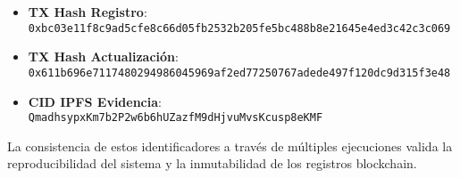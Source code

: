 \begin{itemize}
    \item \textbf{TX Hash Registro}: \texttt{0xbc03e11f8c9ad5cfe8c66d05fb2532b205fe5bc488b8e21645e4ed3c42c3c069}
    \item \textbf{TX Hash Actualización}: \texttt{0x611b696e7117480294986045969af2ed77250767adede497f120dc9d315f3e48}
    \item \textbf{CID IPFS Evidencia}: \texttt{QmadhsypxKm7b2P2w6b6hUZazfM9dHjvuMvsKcusp8eKMF}
\end{itemize}

La consistencia de estos identificadores a través de múltiples ejecuciones valida la reproducibilidad del sistema y la inmutabilidad de los registros blockchain. 